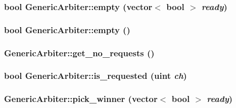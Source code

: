 \hypertarget{classGenericArbiter_0e9396065d7b437fbac43768b3dfb7c1}{
\subsubsection[{empty}]{\setlength{\rightskip}{0pt plus 5cm}bool GenericArbiter::empty (vector$<$ bool $>$ {\em ready})}}
\label{classGenericArbiter_0e9396065d7b437fbac43768b3dfb7c1}


\hypertarget{classGenericArbiter_bd1e990e713578e87719e634884effa6}{
\subsubsection[{empty}]{\setlength{\rightskip}{0pt plus 5cm}bool GenericArbiter::empty ()}}
\label{classGenericArbiter_bd1e990e713578e87719e634884effa6}


\hypertarget{classGenericArbiter_6f8e4f27cf748d7e73f3065d3d8beb2b}{
\subsubsection[{get\_\-no\_\-requests}]{ GenericArbiter::get\_\-no\_\-requests ()}}
\label{classGenericArbiter_6f8e4f27cf748d7e73f3065d3d8beb2b}


\hypertarget{classGenericArbiter_6cb1ab1819bd58fc51935af5af5bd6d5}{
\subsubsection[{is\_\-requested}]{\setlength{\rightskip}{0pt plus 5cm}bool GenericArbiter::is\_\-requested ({\bf uint} {\em ch})}}
\label{classGenericArbiter_6cb1ab1819bd58fc51935af5af5bd6d5}


\hypertarget{classGenericArbiter_d150c66feabc2154efea2fbad441cfc1}{
\subsubsection[{pick\_\-winner}]{ GenericArbiter::pick\_\-winner (vector$<$ bool $>$ {\em ready})}}
\label{classGenericArbiter_d150c66feabc2154efea2fbad441cfc1}


